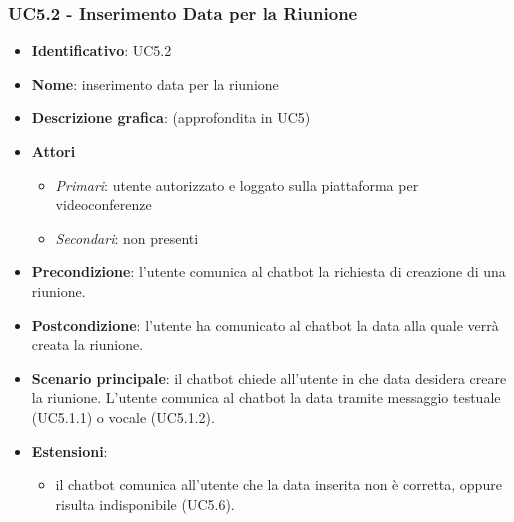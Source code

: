 \subsubsection{UC5.2 - Inserimento Data per la Riunione}
\begin{itemize}
    \item \textbf{Identificativo}: UC5.2
    \item \textbf{Nome}: inserimento data per la riunione
    \item \textbf{Descrizione grafica}: (approfondita in UC5)
    \item \textbf{Attori}
 \begin{itemize} 
    \item \textit{Primari}: utente autorizzato e loggato sulla piattaforma per videoconferenze
    \item \textit{Secondari}: non presenti
 \end{itemize}
 \item \textbf{Precondizione}: l'utente comunica al chatbot la richiesta di creazione di una riunione.
 \item \textbf{Postcondizione}: l'utente ha comunicato al chatbot la data alla quale verrà creata la riunione.
 \item \textbf{Scenario principale}: il chatbot chiede all'utente in che data desidera creare la riunione. L'utente comunica al chatbot la data tramite messaggio testuale (UC5.1.1) o vocale (UC5.1.2).
 \item \textbf{Estensioni}: 
 \begin{itemize} 
    \item il chatbot comunica all'utente che la data inserita non è corretta, oppure risulta indisponibile (UC5.6).
 \end{itemize}
\end{itemize}

